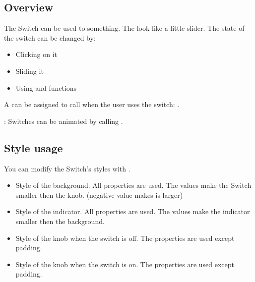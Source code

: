 \documentclass[letterpaper,10pt,english]{sphinxmanual}
\begin{document}
\subsection{Overview}
\label{\detokenize{object-types/sw:overview}}
The Switch can be used to   something. The look like a little slider. The state of the switch can be changed by:
\begin{itemize}
\item {} 
Clicking on it

\item {} 
Sliding it

\item {} 
Using  and  functions

\end{itemize}

A  can be assigned to call when the user uses the switch: .

: Switches can be animated by calling .


\subsection{Style usage}
\label{\detokenize{object-types/sw:style-usage}}
You can modify the Switch’s styles with .
\begin{itemize}
\item {} 
 Style of the background. All  properties are used. The  values make the Switch smaller then the knob. (negative value makes is larger)

\item {} 
 Style of the indicator. All  properties are used. The  values make the indicator smaller then the background.

\item {} 
 Style of the knob when the switch is off.  The  properties are used except padding.

\item {} 
 Style of the knob when the switch is on.  The  properties are used except padding.

\end{itemize}
\end{document}
